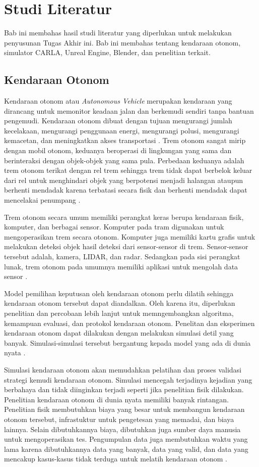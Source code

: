 \chapter{Studi Literatur}

Bab ini membahas hasil studi literatur yang diperlukan untuk melakukan
penyusunan Tugas Akhir ini. Bab ini membahas tentang kendaraan otonom, simulator
CARLA, Unreal Engine, Blender, dan penelitian terkait.

\section{Kendaraan Otonom}

Kendaraan otonom atau \textit{Autonomous Vehicle} merupakan kendaraan yang
dirancang untuk memonitor keadaan jalan dan berkemudi sendiri tanpa bantuan
pengemudi. Kendaraan otonom dibuat dengan tujuan mengurangi jumlah kecelakaan,
mengurangi penggunaan energi, mengurangi polusi, mengurangi kemacetan, dan
meningkatkan akses transportasi \parencite{av-bagloee}. Trem otonom sangat mirip
dengan mobil otonom, keduanya beroperasi di lingkungan yang sama dan
berinteraksi dengan objek-objek yang sama pula. Perbedaan keduanya adalah trem
otonom terikat dengan rel trem sehingga trem tidak dapat berbelok keluar dari
rel untuk menghindari objek yang berpotensi menjadi halangan ataupun berhenti
mendadak karena terbatasi secara fisik dan berhenti mendadak dapat mencelakai
penumpang \parencite{at-palmer}.

Trem otonom secara umum memiliki perangkat keras berupa kendaraan fisik,
komputer, dan berbagai sensor. Komputer pada tram digunakan untuk mengoperasikan
trem secara otonom. Komputer juga memiliki kartu grafis untuk melakukan deteksi
objek hasil deteksi dari sensor-sensor di trem. Sensor-sensor tersebut adalah,
kamera, LIDAR, dan radar. Sedangkan pada sisi perangkat lunak, trem otonom pada
umumnya memiliki aplikasi untuk mengolah data sensor \parencite{at-palmer}.

Model pemilihan keputusan oleh kendaraan otonom perlu dilatih sehingga kendaraan
otonom tersebut dapat diandalkan. Oleh karena itu, diperlukan penelitian dan
percobaan lebih lanjut untuk memngembangkan algoritma, kemampuan evaluasi, dan
protokol kendaraan otonom. Penelitan dan eksperimen kendaraan otonom dapat
dilakukan dengan melakukan simulasi detil yang banyak. Simulasi-simulasi
tersebut bergantung kepada model yang ada di dunia nyata \parencite{av-berger}.

Simulasi kendaraan otonom akan memudahkan pelatihan dan proses validasi strategi
kemudi kendaraan otonom. Simulasi mencegah terjadinya kejadian yang berbahaya
dan tidak diinginkan terjadi seperti jika penelitian fisik dilakukan. Penelitian
kendaraan otonom di dunia nyata memiliki banyak rintangan. Penelitian fisik
membutuhkan biaya yang besar untuk membangun kendaraan otonom tersebut,
infrastuktur untuk pengetesan yang memadai, dan biaya lainnya. Selain
dibutuhkannya biaya, dibutuhkan juga sumber daya manusia untuk mengoperasikan
tes. Pengumpulan data juga membutuhkan waktu yang lama karena dibutuhkannya data
yang banyak, data yang valid, dan data yang mencakup kasus-kasus tidak terduga
untuk melatih kendaraan otonom \parencite{carla-dosovitskiy}.

